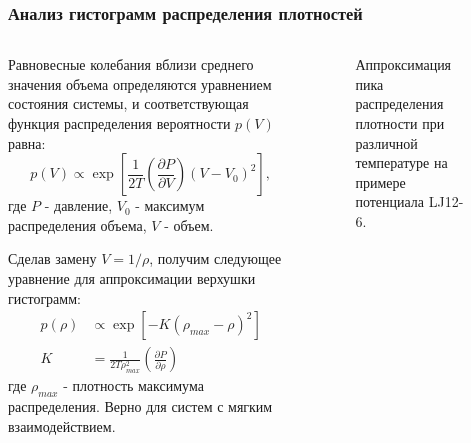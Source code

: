 \documentclass[pdf,hyperref={unicode}]{beamer}
\begin{document}
\begin{frame}
\transdissolve[duration=0.2]
\frametitle{Анализ гистограмм распределения плотностей}

\begin{columns}

\begin{column}{0.45\linewidth}
{\tiny{
Равновесные колебания вблизи среднего значения объема определяются уравнением состояния системы, и соответствующая функция распределения вероятности $p(V)$ равна:
\begin{equation}
p(V) \varpropto \exp\left[ \frac{1}{2T} \left( \frac{\partial P}{\partial V} \right)  \left(V - V_0 \right)^2 \right],
\label{eqPv}
\end{equation}
где $P$ - давление, $V_0$ - максимум распределения объема, $V$ - объем.

Сделав замену $V = 1 / \rho$, получим следующее уравнение для аппроксимации верхушки гистограмм:
\begin{equation}
\begin{aligned}
p(\rho) &\varpropto \exp \left[ - K \left(\rho_{max}- \rho \right)^2 \right] \\
K &= \frac{1}{2T\rho_{max}^2} \left( \frac{\partial P}{\partial \rho} \right)
\end{aligned}
\label{eqFitRho}
\end{equation}
где $\rho_{max}$ - плотность максимума распределения. Верно для систем с мягким взаимодействием. 
}}
\end{column}


\begin{column}{0.65\linewidth}
{
\begin{figure}[h]
\caption{\tiny Аппроксимация пика распределения плотности при различной
температуре на примере потенциала LJ12-6.}
\end{figure}
}
\end{column}

\end{columns}

\end{frame}
\end{document}
